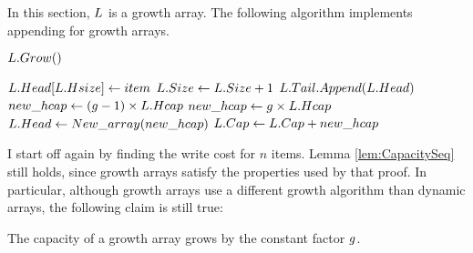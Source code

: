 \HdrGrowthArrayImpl

In this section, $\VarList$ is a growth array. The following algorithm implements appending for growth arrays.

\begin{algorithm}
	\begin{algorithmic}[1]
		\Procedure{$\FuncAppend$}{$\VarList, \ParamItem$}
		\State $L.Grow()$
		\EndIf
		
		\State $L.Head[L.Hsize] \gets item$
		\State $L.Size \gets L.Size + 1$
		\EndProcedure
		\Statex
		\Procedure{$\FuncGrow$}{$\VarList$}
		\State $L.Tail.Append(L.Head)$
			\State $new\_hcap \gets (g - 1) \times L.Hcap$
		\Else
			\State $new\_hcap \gets g \times L.Hcap$
		\EndIf
		\State $L.Head \gets New\_array(new\_hcap)$
		\State $L.Cap \gets L.Cap + new\_hcap$
		\EndProcedure
	\end{algorithmic}
\end{algorithm}

\HdrTimeComplex

I start off again by finding the write cost for $n$ items. Lemma \ref{lem:CapacitySeq} still holds, since growth arrays satisfy the properties used by that proof. In particular, although growth arrays use a different growth algorithm than dynamic arrays, the following claim is still true:

\begin{lemma}
\label{lem:GrowthArraysGrowthFactor}
	The capacity of a growth array grows by the constant factor $g$.
\end{lemma}

